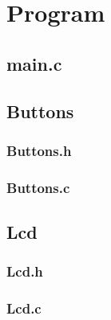 \documentclass[fleqn]{article}
\begin{document}
\pagebreak

\section{Program}
\subsection{main.c}

\noindent\begin{minipage}[t]{.45\textwidth}
	
\end{minipage}\hfill
\noindent\begin{minipage}[t]{.45\textwidth}
	
\end{minipage}\hfill
\pagebreak

\noindent\begin{minipage}[t]{.45\textwidth}
	
\end{minipage}\hfill
\noindent\begin{minipage}[t]{.45\textwidth}
	
	\subsection{Buttons}
	\subsubsection{Buttons.h}
	
	\subsubsection{Buttons.c}
	
\end{minipage}\hfill

\pagebreak

\subsection{Lcd}

\noindent\begin{minipage}[t]{.45\textwidth}
	\subsubsection{Lcd.h}
	
\end{minipage}\hfill
\noindent\begin{minipage}[t]{.45\textwidth}
	\subsubsection{Lcd.c}
	
\end{minipage}\hfill
\end{document}
